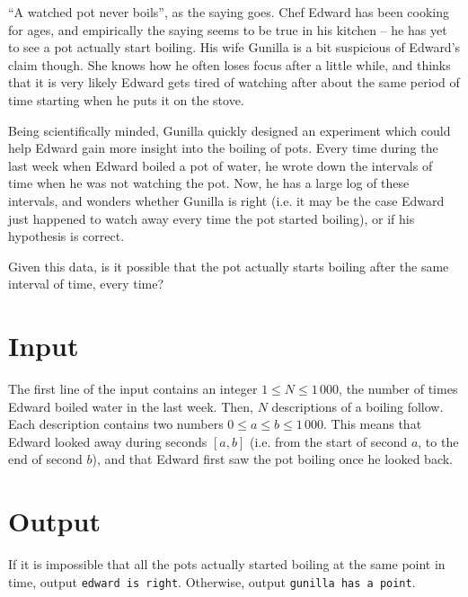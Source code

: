 ``A watched pot never boils'', as the saying goes.
Chef Edward has been cooking for ages, and empirically the saying seems to be true in his kitchen -- he has yet to see a pot actually start boiling.
His wife Gunilla is a bit suspicious of Edward's claim though.
She knows how he often loses focus after a little while, and thinks that it is very likely Edward gets tired of watching after about the same period of time starting when he puts it on the stove.

Being scientifically minded, Gunilla quickly designed an experiment which could help Edward gain more insight into the boiling of pots.
Every time during the last week when Edward boiled a pot of water, he wrote down the intervals of time when he was not watching the pot.
Now, he has a large log of these intervals, and wonders whether Gunilla is right (i.e. it may be the case Edward just happened to watch away every time the pot started boiling), or if his hypothesis is correct.

Given this data, is it possible that the pot actually starts boiling after the same interval of time, every time?

\section*{Input}
The first line of the input contains an integer $1 \le N \le 1\,000$, the number of times Edward boiled water in the last week.
Then, $N$ descriptions of a boiling follow.
Each description contains two numbers $0 \le a \le b \le 1\,000$.
This means that Edward looked away during seconds $[a, b]$ (i.e. from the start of second $a$, to the end of second $b$), and that Edward first saw the pot boiling once he looked back.

\section*{Output}
If it is impossible that all the pots actually started boiling at the same point in time, output \texttt{edward is right}.
Otherwise, output \texttt{gunilla has a point}.
